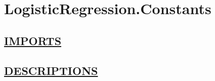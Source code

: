 \chapter*{LogisticRegression.Constants}
\hypertarget{ecldoc:toc:LogisticRegression.Constants}{}

\section*{\underline{IMPORTS}}

\section*{\underline{DESCRIPTIONS}}
